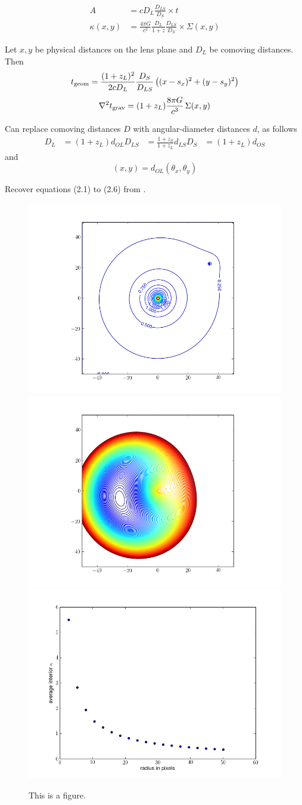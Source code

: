 \documentclass[12pt,preprint]{aastex}
\begin{document}
\begin{equation}
\begin{aligned}
A           &= cD_L \frac{D_{LS}}{D_S} \times t \\
\kappa(x,y) &= \frac{4\pi G}{c^2} \frac{D_L}{1+z} \frac{D_{LS}}{D_S}
               \times \Sigma(x,y)
\end{aligned}
\end{equation}

Let $x,y$ be physical distances on the lens plane and $D_L$ be
comoving distances.  Then
\begin{equation}
t_{\rm geom} = \frac{(1+z_L)^2}{2cD_L} \frac{D_S}{D_{LS}}
\left( (x-s_x)^2 + (y-s_y)^2 \right)
\end{equation}
\begin{equation}
\nabla^2 t_{\rm grav} = (1+z_L)\frac{8\pi G}{c^3} \, \Sigma(x,y)
\end{equation}

Can replace comoving distances $D$ with angular-diameter distances
$d$, as follows
\begin{equation}
\begin{aligned}
D_L    &= (1+z_L) d_{OL}
D_{LS} &= \frac{1+z_S}{1+z_L} d_{LS}
D_S    &= (1+z_L) d_{OS}
\end{aligned}
\end{equation}
and
\begin{equation}
(x,y) = d_{OL} (\theta_x,\theta_y)
\end{equation}

Recover equations (2.1) to (2.6) from \cite{1986ApJ...310..568B}.

\newpage




\newpage

\begin{figure}
\includegraphics[width=.3\hsize]{ASW0000kadC_kappa.png}
\includegraphics[width=.3\hsize]{ASW0000kadC_arriv.png}
\includegraphics[width=.3\hsize]{ASW0000kadC_menc.png}
\caption{This is a figure.\label{fig:ASW0000kad}}
\end{figure}
\end{document}
